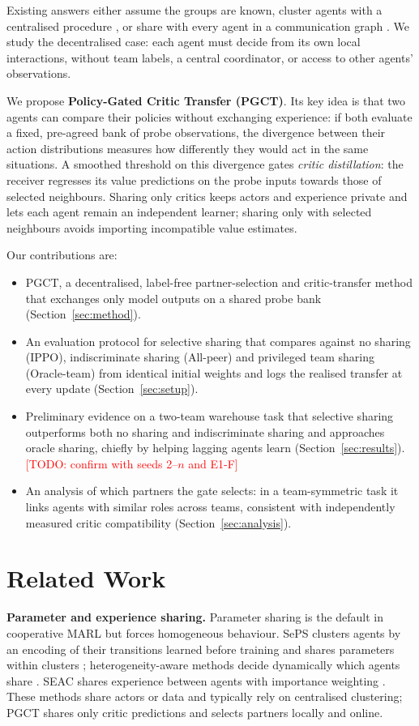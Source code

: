 \documentclass{article}
\newcommand{\todo}[1]{\textcolor{red}{[TODO: #1]}}
\newcommand{\ours}{PGCT}
\begin{document}
Existing answers either assume the groups are known, cluster agents with a centralised procedure
\cite{christianos2021seps,hu2025heterogeneity}, or share with every agent in a communication graph
\cite{zhang2018networked}. We study the decentralised case: each agent must decide from its own local
interactions, without team labels, a central coordinator, or access to other agents' observations.

We propose \textbf{Policy-Gated Critic Transfer (\ours{})}. Its key idea is that two agents can compare their
policies without exchanging experience: if both evaluate a fixed, pre-agreed bank of probe observations, the
divergence between their action distributions measures how differently they would act in the same situations.
A smoothed threshold on this divergence gates \emph{critic distillation}: the receiver regresses its value
predictions on the probe inputs towards those of selected neighbours. Sharing only critics keeps actors and
experience private and lets each agent remain an independent learner; sharing only with selected neighbours
avoids importing incompatible value estimates.

Our contributions are:
\begin{itemize}
  \item \ours{}, a decentralised, label-free partner-selection and critic-transfer method that exchanges only
    model outputs on a shared probe bank (Section~\ref{sec:method}).
  \item An evaluation protocol for selective sharing that compares against no sharing (IPPO), indiscriminate
    sharing (All-peer) and privileged team sharing (Oracle-team) from identical initial weights and logs the
    realised transfer at every update (Section~\ref{sec:setup}).
  \item Preliminary evidence on a two-team warehouse task that selective sharing outperforms both no sharing and
    indiscriminate sharing and approaches oracle sharing, chiefly by helping lagging agents learn
    (Section~\ref{sec:results}). \todo{confirm with seeds 2--$n$ and E1-F}
  \item An analysis of which partners the gate selects: in a team-symmetric task it links agents with similar roles
    across teams, consistent with independently measured critic compatibility (Section~\ref{sec:analysis}).
\end{itemize}

\section{Related Work}
\textbf{Parameter and experience sharing.} Parameter sharing is the default in cooperative MARL but forces
homogeneous behaviour. SePS clusters agents by an encoding of their transitions learned before training and
shares parameters within clusters \cite{christianos2021seps}; heterogeneity-aware methods decide dynamically
which agents share \cite{hu2025heterogeneity}. SEAC shares experience between agents with importance weighting
\cite{christianos2020seac}. These methods share actors or data and typically rely on centralised clustering;
\ours{} shares only critic predictions and selects partners locally and online.
\end{document}
